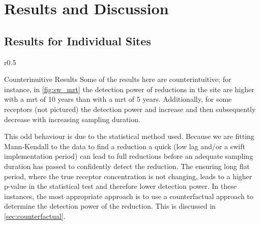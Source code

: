 
\section[Results and Discussion]{Results and Discussion} \label{sec:results}

\subsection[Site Results]{Results for Individual Sites} \label{sec:site_results}


\begin{wrapfigure}{r}{0.5\textwidth}
    \begin{breakawaybox}[
        label={box:wierdresults}]{Counterinuitive Results}
        Some of the results here are counterintuitive; for instance, in \autoref{fig:sw_mrt} the detection power of reductions in the site are higher with a \gls{mrt} of 10 years than with a \gls{mrt} of 5 years. Additionally, for some receptors (not pictured) the detection power and increase and then subsequently decrease with increasing sampling duration.

        This odd behaviour is due to the statistical method used. Because we are fitting Mann-Kendall to the data to find a reduction a quick (low lag and/or a swift implementation period) can lead to full reductions before an adequate sampling duration has passed to confidently detect the reduction.  The ensuring long flat period, where the true receptor concentration is not changing, leads to a higher p-value in the statistical test and therefore lower detection power.  In these instances, the most appropriate approach is to use a counterfactual approach to determine the detection power of the reduction.  This is discussed in \autoref{sec:counterfactual}.
    \end{breakawaybox}
\end{wrapfigure}

